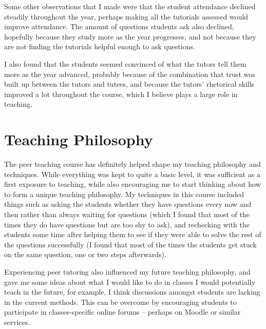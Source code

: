 \documentclass[12pt,avenir,a4paper,final]{iopart}
\begin{document}
\indent \par{}  Some other observations that I made were that the student attendance declined steadily throughout the year, perhaps making all the tutorials assessed would improve attendance. The amount of questions students ask also declined, hopefully because they study more as the year progresses, and not because they are not finding the tutorials helpful enough to ask questions.

\indent \par{} I also found that the students seemed convinced of what the tutors tell them more as the year advanced, probably because of the combination that trust was built up between the tutors and tutees, and because the tutors' rhetorical skills improved a lot throughout the course, which I believe plays a large role in teaching.

\section{Teaching Philosophy}
\label{2}
\indent \par{} The peer teaching course has definitely helped shape my teaching philosophy and techniques. While everything was kept to quite a basic level, it was sufficient as a first exposure to teaching, while also encouraging me to start thinking about how to form a unique teaching philosophy. My techniques in this course included things such as asking the students whether they have questions every now and then rather than always waiting for questions (which I found that most of the times they do have questions but are too shy to ask), and rechecking with the students some time after helping them to see if they were able to solve the rest of the questions successfully (I found that most of the times the students get stuck on the same question, one or two steps afterwards). 

\indent \par{} Experiencing peer tutoring also influenced my future teaching philosophy, and gave me some ideas about what I would like to do in classes I would potentially teach in the future, for example, I think discussions amongst students are lacking in the current methods. This can be overcome by encouraging students to participate in classes-specific online forums -- perhaps on Moodle or similar services.
\end{document}
